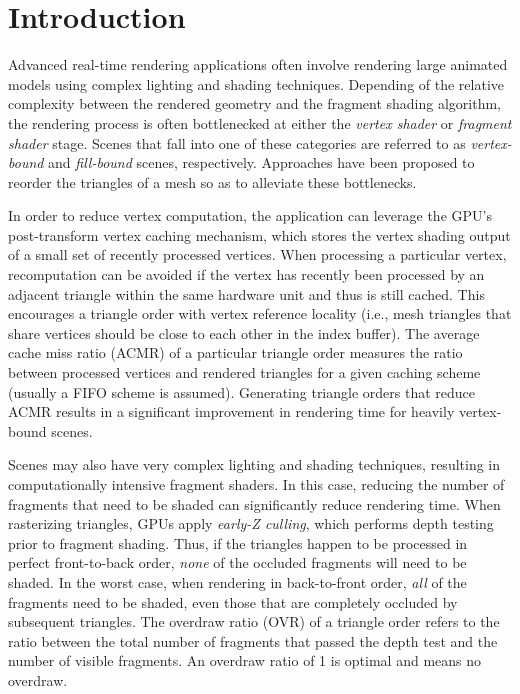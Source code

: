 \setlength{\parskip}{5pt plus 1pt minus 1pt}
\section{Introduction}

Advanced real-time rendering applications often involve rendering large animated models using complex lighting and shading techniques. Depending of the relative complexity between the rendered geometry and the fragment shading algorithm, the rendering process is often bottlenecked at either the {\em vertex shader} or {\em fragment shader} stage. Scenes that fall into one of these categories are referred to as  {\em vertex-bound} and {\em fill-bound} scenes, respectively. Approaches have been proposed to reorder the triangles of a mesh so as to alleviate these bottlenecks.

In order to reduce vertex computation, the application can leverage the GPU's post-transform vertex caching mechanism, which stores the vertex shading output of a small set of recently processed vertices. When processing a particular vertex, recomputation can be avoided if the vertex has recently been processed by an adjacent triangle within the same hardware unit and thus is still cached. This encourages a triangle order with vertex reference locality (i.e., mesh triangles that share vertices should be close to each other in the index buffer). The average cache miss ratio (ACMR) of a particular triangle order measures the ratio between processed vertices and rendered triangles for a given caching scheme (usually a FIFO scheme is assumed). Generating triangle orders that reduce ACMR results in a significant improvement in rendering time for heavily vertex-bound scenes.

Scenes may also have very complex lighting and shading techniques, resulting in computationally intensive fragment shaders. In this case, reducing the number of fragments that need to be shaded can significantly reduce rendering time. When rasterizing triangles, GPUs apply {\em early-Z culling}, which performs depth testing prior to fragment shading. Thus, if the triangles happen to be processed in perfect front-to-back order, {\em none} of the occluded fragments will need to be shaded. In the worst case, when rendering in back-to-front order, {\em all} of the fragments need to be shaded, even those that are completely occluded by subsequent triangles. The overdraw ratio (OVR) of a triangle order refers to the ratio between the total number of fragments that passed the depth test and the number of visible fragments. An overdraw ratio of 1 is optimal and means no overdraw.

